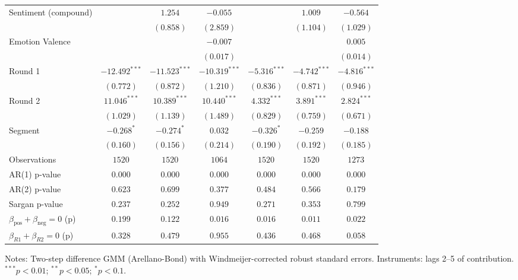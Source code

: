 {\begin{tabular}{l c c c c c c}
Sentiment (compound)                              &                 & $1.254$         & $-0.055$        &                & $1.009$        & $-0.564$       \\
                                                  &                 & $(0.858)$       & $(2.859)$       &                & $(1.104)$      & $(1.029)$      \\
Emotion Valence                                   &                 &                 & $-0.007$        &                &                & $0.005$        \\
                                                  &                 &                 & $(0.017)$       &                &                & $(0.014)$      \\
Round 1                                           & $-12.492^{***}$ & $-11.523^{***}$ & $-10.319^{***}$ & $-5.316^{***}$ & $-4.742^{***}$ & $-4.816^{***}$ \\
                                                  & $(0.772)$       & $(0.872)$       & $(1.210)$       & $(0.836)$      & $(0.871)$      & $(0.946)$      \\
Round 2                                           & $11.046^{***}$  & $10.389^{***}$  & $10.440^{***}$  & $4.332^{***}$  & $3.891^{***}$  & $2.824^{***}$  \\
                                                  & $(1.029)$       & $(1.139)$       & $(1.489)$       & $(0.829)$      & $(0.759)$      & $(0.671)$      \\
Segment                                           & $-0.268^{*}$    & $-0.274^{*}$    & $0.032$         & $-0.326^{*}$   & $-0.259$       & $-0.188$       \\
                                                  & $(0.160)$       & $(0.156)$       & $(0.214)$       & $(0.190)$      & $(0.192)$      & $(0.185)$      \\
\midrule
Observations                                      & $1520$          & $1520$          & $1064$          & $1520$         & $1520$         & $1273$         \\
AR(1) p-value                                     & $0.000$         & $0.000$         & $0.000$         & $0.000$        & $0.000$        & $0.000$        \\
AR(2) p-value                                     & $0.623$         & $0.699$         & $0.377$         & $0.484$        & $0.566$        & $0.179$        \\
Sargan p-value                                    & $0.237$         & $0.252$         & $0.949$         & $0.271$        & $0.353$        & $0.799$        \\
$\beta_{\text{pos}} + \beta_{\text{neg}} = 0$ (p) & $0.199$         & $0.122$         & $0.016$         & $0.016$        & $0.011$        & $0.022$        \\
$\beta_{R1} + \beta_{R2} = 0$ (p)                 & $0.328$         & $0.479$         & $0.955$         & $0.436$        & $0.468$        & $0.058$        \\
\bottomrule
\end{tabular}%
}
\begin{minipage}{\textwidth}\scriptsize Notes: Two-step difference GMM (Arellano-Bond) with Windmeijer-corrected robust standard errors. Instruments: lags 2--5 of contribution. $^{***}p<0.01$; $^{**}p<0.05$; $^{*}p<0.1$.\end{minipage}

